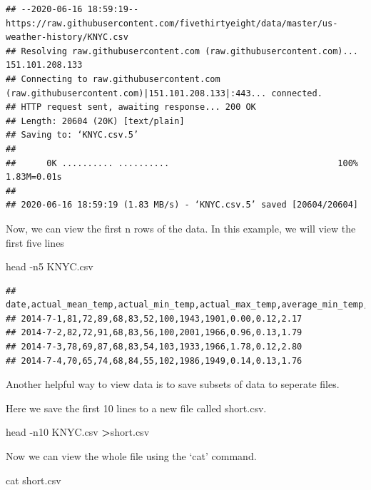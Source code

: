 \documentclass[]{book}
\newenvironment{Shaded}{\begin{snugshade}}{\end{snugshade}}
\newcommand{\FunctionTok}[1]{\textcolor[rgb]{0.00,0.00,0.00}{#1}}
\newcommand{\OperatorTok}[1]{\textcolor[rgb]{0.81,0.36,0.00}{\textbf{#1}}}
\newcommand{\NormalTok}[1]{#1}
\begin{document}
\begin{verbatim}
## --2020-06-16 18:59:19--  https://raw.githubusercontent.com/fivethirtyeight/data/master/us-weather-history/KNYC.csv
## Resolving raw.githubusercontent.com (raw.githubusercontent.com)... 151.101.208.133
## Connecting to raw.githubusercontent.com (raw.githubusercontent.com)|151.101.208.133|:443... connected.
## HTTP request sent, awaiting response... 200 OK
## Length: 20604 (20K) [text/plain]
## Saving to: ‘KNYC.csv.5’
## 
##      0K .......... ..........                                 100% 1.83M=0.01s
## 
## 2020-06-16 18:59:19 (1.83 MB/s) - ‘KNYC.csv.5’ saved [20604/20604]
\end{verbatim}

Now, we can view the first n rows of the data. In this example, we will
view the first five lines

\begin{Shaded}
\begin{Highlighting}[]
\FunctionTok{head}\NormalTok{ -n5 KNYC.csv}
\end{Highlighting}
\end{Shaded}

\begin{verbatim}
## date,actual_mean_temp,actual_min_temp,actual_max_temp,average_min_temp,average_max_temp,record_min_temp,record_max_temp,record_min_temp_year,record_max_temp_year,actual_precipitation,average_precipitation,record_precipitation
## 2014-7-1,81,72,89,68,83,52,100,1943,1901,0.00,0.12,2.17
## 2014-7-2,82,72,91,68,83,56,100,2001,1966,0.96,0.13,1.79
## 2014-7-3,78,69,87,68,83,54,103,1933,1966,1.78,0.12,2.80
## 2014-7-4,70,65,74,68,84,55,102,1986,1949,0.14,0.13,1.76
\end{verbatim}

Another helpful way to view data is to save subsets of data to seperate
files.

Here we save the first 10 lines to a new file called short.csv.

\begin{Shaded}
\begin{Highlighting}[]
\FunctionTok{head}\NormalTok{ -n10 KNYC.csv }\OperatorTok{>}\NormalTok{short.csv}
\end{Highlighting}
\end{Shaded}

Now we can view the whole file using the `cat' command.

\begin{Shaded}
\begin{Highlighting}[]
\FunctionTok{cat}\NormalTok{ short.csv}
\end{Highlighting}
\end{Shaded}
\end{document}
